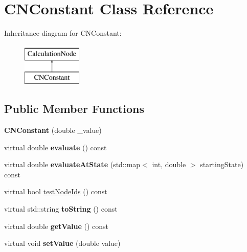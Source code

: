 \hypertarget{classCNConstant}{}\section{C\+N\+Constant Class Reference}
\label{classCNConstant}
Inheritance diagram for C\+N\+Constant\+:\begin{figure}[H]
\begin{center}
\leavevmode
\includegraphics[height=2.000000cm]{classCNConstant}
\end{center}
\end{figure}
\subsection*{Public Member Functions}
\begin{DoxyCompactItemize}
\item 
{\bfseries C\+N\+Constant} (double \+\_\+value)\hypertarget{classCNConstant_a0cf39e7ec935e90a472f8bf4fd784fa2}{}\label{classCNConstant_a0cf39e7ec935e90a472f8bf4fd784fa2}

\item 
virtual double {\bfseries evaluate} () const \hypertarget{classCNConstant_af8f9ed8124c661e1dd31df7e6eed94c3}{}\label{classCNConstant_af8f9ed8124c661e1dd31df7e6eed94c3}

\item 
virtual double {\bfseries evaluate\+At\+State} (std\+::map$<$ int, double $>$ starting\+State) const \hypertarget{classCNConstant_a00d59d4252567658adfc516169645ff5}{}\label{classCNConstant_a00d59d4252567658adfc516169645ff5}

\item 
virtual bool \hyperlink{classCNConstant_aaa0511d5aa204f30769f2a3a33f78f91}{test\+Node\+Ids} () const 
\item 
virtual std\+::string {\bfseries to\+String} () const \hypertarget{classCNConstant_abd2085b23c5a3502b645068caf53a43f}{}\label{classCNConstant_abd2085b23c5a3502b645068caf53a43f}

\item 
virtual double {\bfseries get\+Value} () const \hypertarget{classCNConstant_ac416282fca8424c0f3d6d65fa2b96f20}{}\label{classCNConstant_ac416282fca8424c0f3d6d65fa2b96f20}

\item 
virtual void {\bfseries set\+Value} (double value)\hypertarget{classCNConstant_a964d75e6934098c33853009a43685a0e}{}\label{classCNConstant_a964d75e6934098c33853009a43685a0e}

\end{DoxyCompactItemize}
